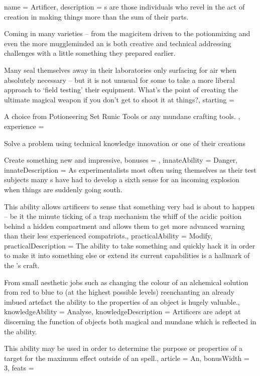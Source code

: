 \archetype
{
	name = Artificer,
	description = \bname{}s are those individuals who revel in the act of creation\comma{} in making things more than the sum of their parts. 

Coming in many varieties – from the magic\minus{}item driven  to the potion\minus{}mixing  and even the more muggle\minus{}minded \comma{} an  is both creative and technical\comma{} addressing challenges with a little something they prepared earlier. 

Many  seal themselves away in their laboratories\comma{} only surfacing for air when absolutely necessary – but it is not unusual for some to take a more liberal approach to `field testing’ their equipment. What’s the point of creating the ultimate magical weapon if you don’t get to shoot it at things?,
	starting = 
\item A choice from Potioneering Set\comma{} Runic Tools\comma{} or any mundane crafting tools.
,
	experience = \item Solve a problem using technical knowledge\comma{} innovation or one of their creations
\item Create something new and impressive,
	bonuses = 
,
	innateAbility = Danger,
	innateDescription = As experimentalists\comma{} most often using themselves as their test subjects\comma{} many {\bname{}}s have had to develop a sixth sense for an incoming explosion when things are suddenly going south. 

This ability allows artificers to sense that something very bad is about to happen – be it the minute ticking of a trap mechanism\comma{} the whiff of the acidic poition behind a hidden compartment\comma{} and allows them to get more advanced warning than their less experienced compatriots.,
	practicalAbility = Modify,
	practicalDescription = The ability to take something and quickly hack it in order to make it into something else\comma{} or extend its current capabilities\comma{} is a hallmark of the \bname{}’s craft. 

From small aesthetic jobs\comma{} such as changing the colour of an alchemical solution from red to blue\comma{} to (at the highest possible levels)\comma{} re\minus{}enchanting an already imbued artefact\comma{} the ability to  the properties of an object is hugely valuable.,
	knowledgeAbility = Analyse,
	knowledgeDescription = Artificers are adept at discerning the function of objects\comma{} both magical and mundane\comma{} which is reflected in the  ability. 

This ability may be used in order to determine the purpose or properties of a target for the maximum effect outside of an  spell.,
	article = An,
	bonusWidth = 3, feats = \ArtificerFeats
}

